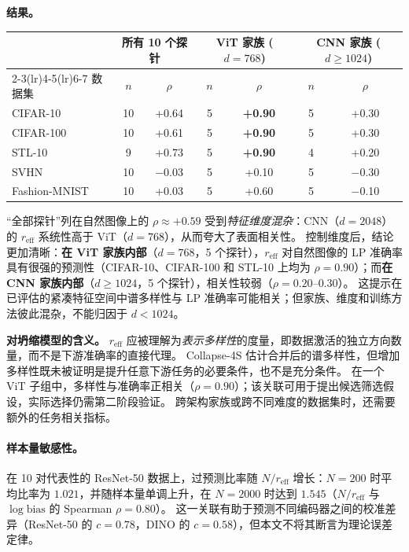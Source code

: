 \documentclass{article}
\newcommand{\reff}{\ensuremath{r_{\mathrm{eff}}}\xspace}
\begin{document}
\textbf{结果。}

\begin{center}
\setlength{\tabcolsep}{4pt}
\begin{tabular}{lcccccc}
\toprule
& \multicolumn{2}{c}{所有 10 个探针} & \multicolumn{2}{c}{ViT 家族 ($d=768$)} & \multicolumn{2}{c}{CNN 家族 ($d\geq1024$)} \\
\cmidrule(lr){2-3}\cmidrule(lr){4-5}\cmidrule(lr){6-7}
数据集 & $n$ & $\rho$ & $n$ & $\rho$ & $n$ & $\rho$ \\
\midrule
CIFAR-10  & 10 & +0.64 & 5 & \textbf{+0.90} & 5 & +0.30 \\
CIFAR-100 & 10 & +0.61 & 5 & \textbf{+0.90} & 5 & +0.30 \\
STL-10    &  9 & +0.73 & 5 & \textbf{+0.90} & 4 & +0.20 \\
SVHN      & 10 & $-$0.03 & 5 & +0.10 & 5 & $-$0.30 \\
Fashion-MNIST & 10 & +0.03 & 5 & +0.60 & 5 & $-$0.10 \\
\bottomrule
\end{tabular}
\end{center}
“全部探针”列在自然图像上的 $\rho\approx+0.59$ 受到\emph{特征维度混杂}：CNN（$d{=}2048$）的 $\reff$ 系统性高于 ViT（$d{=}768$），从而夸大了表面相关性。
控制维度后，结论更加清晰：\textbf{在 ViT 家族内部}（$d{=}768$，5 个探针），$\reff$ 对自然图像的 LP 准确率具有很强的预测性（CIFAR-10、CIFAR-100 和 STL-10 上均为 $\rho{=}0.90$）；而\textbf{在 CNN 家族内部}（$d{\geq}1024$，5 个探针），相关性较弱（$\rho{=}0.20$--$0.30$）。
这提示在已评估的紧凑特征空间中谱多样性与 LP 准确率可能相关；但家族、维度和训练方法彼此混杂，不能归因于 $d{<}1024$。

\textbf{对坍缩模型的含义。}
$\reff$ 应被理解为\emph{表示多样性}的度量，即数据激活的独立方向数量，而不是下游准确率的直接代理。
Collapse-4S 估计合并后的谱多样性，但增加多样性既未被证明是提升任意下游任务的必要条件，也不是充分条件。
在一个 ViT 子组中，多样性与准确率正相关（$\rho{=}0.90$）；该关联可用于提出候选筛选假设，实际选择仍需第二阶段验证。
跨架构家族或跨不同难度的数据集时，还需要额外的任务相关指标。


\paragraph{样本量敏感性。}
在 10 对代表性的 ResNet-50 数据上，过预测比率随 $N/\reff$ 增长：$N{=}200$ 时平均比率为 $1.021$，并随样本量单调上升，在 $N{=}2000$ 时达到 $1.545$（$N/\reff$ 与 $\log\mathrm{bias}$ 的 Spearman $\rho{=}0.80$）。
这一关联有助于预测不同编码器之间的校准差异（ResNet-50 的 $c{=}0.78$，DINO 的 $c{=}0.58$），但本文不将其断言为理论误差定律。
\newpage

\end{document}
